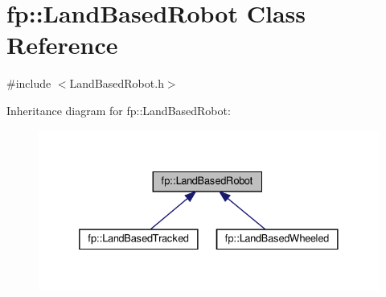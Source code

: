 \hypertarget{classfp_1_1_land_based_robot}{}\section{fp\+:\+:Land\+Based\+Robot Class Reference}
\label{classfp_1_1_land_based_robot}


{\ttfamily \#include $<$Land\+Based\+Robot.\+h$>$}



Inheritance diagram for fp\+:\+:Land\+Based\+Robot\+:
\nopagebreak
\begin{figure}[H]
\begin{center}
\leavevmode
\includegraphics[width=332pt]{classfp_1_1_land_based_robot__inherit__graph}
\end{center}
\end{figure}
